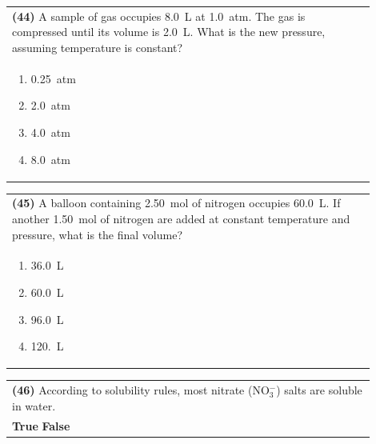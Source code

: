 \documentclass{article}
\begin{document}
{{\vspace{0.2cm}
\noindent\begin{tabular}{|p{0.9\linewidth}|}
\hline
\textbf{(44)} A sample of gas occupies 8.0~L at 1.0~atm. The gas is compressed until its volume is 2.0~L. What is the new pressure, assuming temperature is constant?\\[0.2cm]
\begin{minipage}[t]{0.85\linewidth}
\begin{enumerate}[label=\alph*.]
\item 0.25~atm
\item 2.0~atm
\item 4.0~atm
\item 8.0~atm
\end{enumerate}
\end{minipage}\\[0.2cm]
\hline
\end{tabular}
\newpage

\vspace{0.2cm}
\noindent\begin{tabular}{|p{0.9\linewidth}|}
\hline
\textbf{(45)} A balloon containing 2.50~mol of nitrogen occupies 60.0~L. If another 1.50~mol of nitrogen are added at constant temperature and pressure, what is the final volume?\\[0.2cm]
\begin{minipage}[t]{0.85\linewidth}
\begin{enumerate}[label=\alph*.]
\item 36.0~L
\item 60.0~L
\item 96.0~L
\item 120.~L
\end{enumerate}
\end{minipage}\\[0.2cm]
\hline
\end{tabular}

\vspace{0.2cm}
\noindent\begin{tabular}{|p{0.9\linewidth}|}
\hline
\textbf{(46)} According to solubility rules, most nitrate (NO$_3^-$) salts are soluble in water.\\[0.2cm]
\textbf{True} \hspace{1cm} \textbf{False}\\[0.2cm]
\hline
\end{tabular}

}}
\end{document}
